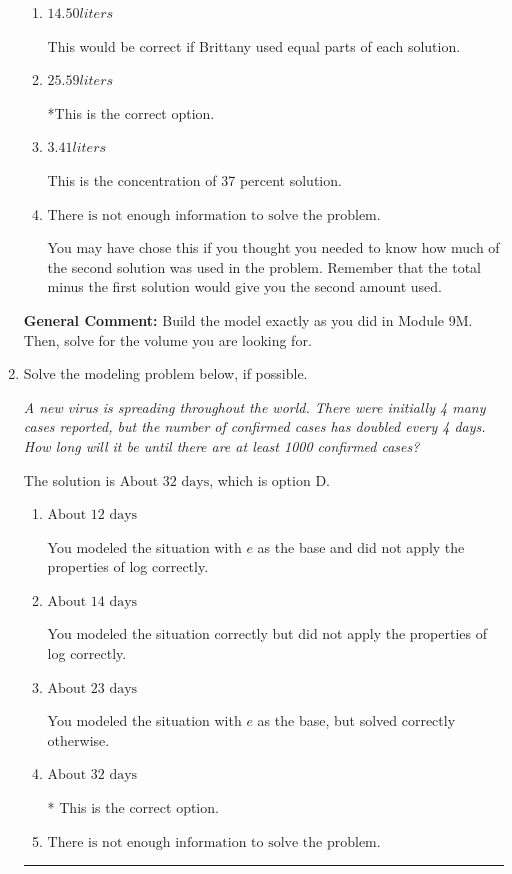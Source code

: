\documentclass{extbook}[14pt]
\newcommand{\litem}[1]{\item #1

\rule{\textwidth}{0.4pt}}
\begin{document}
\begin{enumerate}
{\begin{enumerate}[label=\Alph*.]
This was a random value. If this was not a guess, contact the coordinator to talk about how you got this value.
\item \( 14.50 liters \)

This would be correct if Brittany used equal parts of each solution.
\item \( 25.59 liters \)

*This is the correct option.
\item \( 3.41 liters \)

This is the concentration of 37 percent solution.
\item \( \text{There is not enough information to solve the problem.} \)

You may have chose this if you thought you needed to know how much of the second solution was used in the problem. Remember that the total minus the first solution would give you the second amount used.
\end{enumerate}

\textbf{General Comment:} Build the model exactly as you did in Module 9M. Then, solve for the volume you are looking for.
}
\litem{
Solve the modeling problem below, if possible.

\begin{center}
    \textit{ A new virus is spreading throughout the world. There were initially 4 many cases reported, but the number of confirmed cases has doubled every 4 days. How long will it be until there are at least 1000 confirmed cases? }
\end{center}
The solution is \( \text{About } 32 \text{ days} \), which is option D.\begin{enumerate}[label=\Alph*.]
\item \( \text{About } 12 \text{ days} \)

You modeled the situation with $e$ as the base and did not apply the properties of log correctly.
\item \( \text{About } 14 \text{ days} \)

You modeled the situation correctly but did not apply the properties of log correctly.
\item \( \text{About } 23 \text{ days} \)

You modeled the situation with $e$ as the base, but solved correctly otherwise.
\item \( \text{About } 32 \text{ days} \)

* This is the correct option.
\item \( \text{There is not enough information to solve the problem.} \)


\end{enumerate}}
\end{enumerate}
\end{document}
